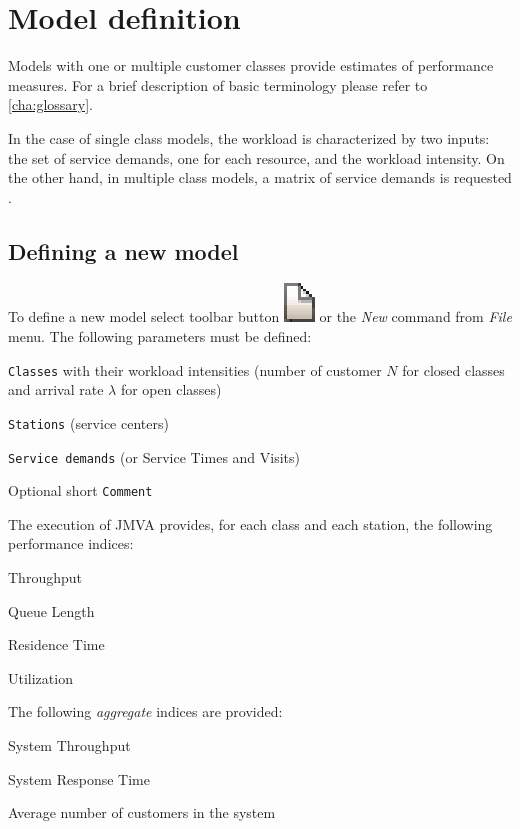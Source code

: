 \section{Model definition}
Models with one or multiple customer classes provide estimates of
performance measures. For a brief description of basic terminology
please refer to \autoref{cha:glossary}.

In the case of single class models, the workload is characterized by
two inputs: the set of service demands, one for each resource, and
the workload intensity. On the other hand, in multiple class models,
a matrix of service demands is requested \cite{Lazowska}.

\subsection{Defining a new model}
To define a new model select toolbar button
\includegraphics[scale=.8]{img/jmva/new} or the \emph{New} command
from \emph{File} menu. The following parameters must be defined:
\begin{enumerate*}
\item \texttt{Classes} with their workload intensities (number of customer
$N$ for closed classes and arrival rate $\lambda$ for open classes)
\item \texttt{Stations} (service centers)
\item \texttt{Service demands} (or Service Times and Visits)
\item Optional short \texttt{Comment}
\end{enumerate*}

The execution of JMVA provides, for each class and each station, the
following performance indices:

\begin{itemize*}
\item Throughput
\item Queue Length
\item Residence Time
\item Utilization
\end{itemize*}

\noindent The following \emph{aggregate} indices are provided:
\begin{itemize*}
\item System Throughput
\item System Response Time
\item Average number of customers in the system
\end{itemize*}


